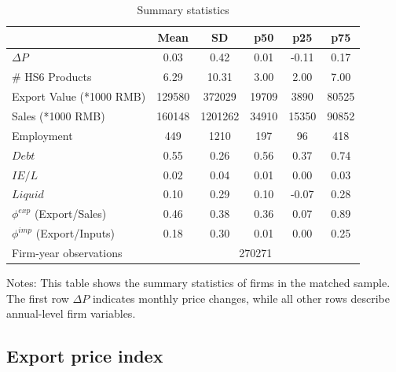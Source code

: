 \begin{table}[htbp]
    \centering
    \caption{Summary statistics}
    \begin{threeparttable}
    \begin{tabular}{lccccc}
    \toprule
            &        Mean&          SD&         p50&         p25&         p75\\
    \midrule
    $\Delta P$        &        0.03&        0.42&        0.01&       -0.11&        0.17\\
    \# HS6 Products           &        6.29&       10.31&        3.00&        2.00&        7.00\\
    Export Value (*1000 RMB)    &   129580&   372029&    19709&     3890&    80525\\
    Sales (*1000 RMB)   &   160148&  1201262&    34910&    15350&    90852\\
    Employment     &      449&     1210&      197&       96&      418\\
    $Debt$              &        0.55&        0.26&        0.56&        0.37&        0.74\\
    $IE/L$               &        0.02&        0.04&        0.01&        0.00&        0.03\\
    $Liquid$       &        0.10 &        0.29 &        0.10 &       -0.07 &        0.28\\
    $\phi^{exp}$ (Export/Sales)         &        0.46&        0.38&        0.36&        0.07&        0.89\\
    $\phi^{imp}$ (Export/Inputs)               &        0.18&        0.30&        0.01&        0.00&        0.25\\
    \midrule
    Firm-year observations        &     \multicolumn{5}{c}{270271}      \\
    \bottomrule
    \end{tabular}
        \begin{tablenotes}
		\footnotesize
            \item Notes: This table shows the summary statistics of firms in the matched sample. The first row $\Delta P$ indicates monthly price changes, while all other rows describe annual-level firm variables.
	\end{tablenotes}
	\end{threeparttable}
    \label{tab.summary}
\end{table}

\subsection{Export price index}


